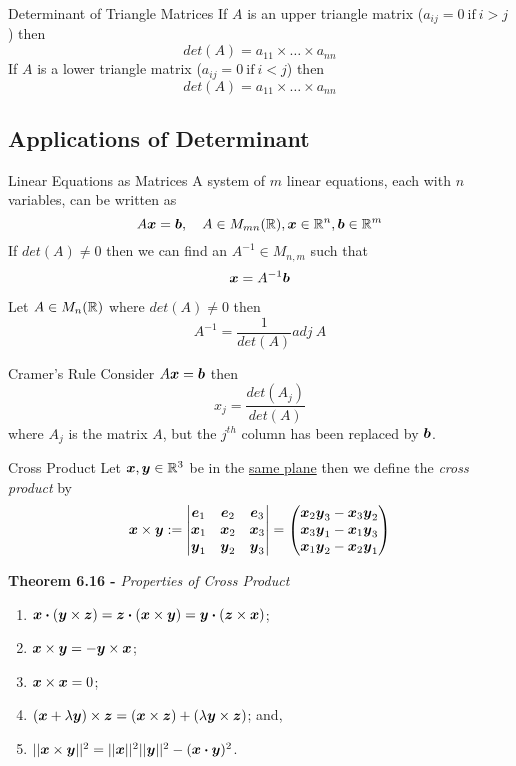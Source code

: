 \documentclass[11pt,a4paper]{article}
\begin{document}
\subtitle{Remark 6.11 - }{Determinant of Triangle Matrices}
If $A$ is an upper triangle matrix ($a_{ij} = 0 \mathrm{\ if\ } i > j$) then $$det(A) = a_{11} \times \dots \times a_{nn}$$
If $A$ is a lower triangle matrix ($a_{ij} = 0 \mathrm{\ if\ } i < j$) then $$det(A) = a_{11} \times \dots \times a_{nn}$$

\subsection{Applications of Determinant}

\subtitle{Theorem 6.12 - }{Linear Equations as Matrices}
A system of $m$ linear equations, each with $n$ variables, can be written as $$A\boldsymbol{x} = \boldsymbol{b},\quad A \in M_{mn}(\mathbb{R}), \boldsymbol{x} \in \mathbb{R}^n, \boldsymbol{b} \in \mathbb{R}^m$$
If $det(A) \not = 0$ then we can find an $A^{-1} \in M_{n,m}$ such that $$\boldsymbol{x} = A^{-1}\boldsymbol{b}$$

\subtitle{Theorem 6.13}{}
Let $A \in M_n(\mathbb{R})$ where $det(A) \not = 0$ then $$A^{-1} = \frac{1}{det(A)}adj\ A$$

\subtitle{Theorem 6.14 - }{Cramer's Rule}
Consider $A\boldsymbol{x} = \boldsymbol{b}$ then $$x_j = \frac{det(A_j)}{det(A)}$$ where $A_j$ is the matrix $A$, but the $j^{th}$ column has been replaced by $\boldsymbol{b}$. \\

\subtitle{Definition 6.15 - }{Cross Product}
Let $\boldsymbol{x}, \boldsymbol{y} \in \mathbb{R}^3$ be in the \underline{same plane} then we define the \textit{cross product} by
$$\boldsymbol{x} \times \boldsymbol{y} := \begin{vmatrix}
  \boldsymbol{e}_1 & \boldsymbol{e}_2 & \boldsymbol{e}_3 \\
  \boldsymbol{x}_1 & \boldsymbol{x}_2 & \boldsymbol{x}_3 \\
  \boldsymbol{y}_1 & \boldsymbol{y}_2 & \boldsymbol{y}_3
\end{vmatrix} = \begin{pmatrix}
  \boldsymbol{x}_2\boldsymbol{y}_3 - \boldsymbol{x}_3\boldsymbol{y}_2 \\
  \boldsymbol{x}_3\boldsymbol{y}_1 - \boldsymbol{x}_1\boldsymbol{y}_3 \\
  \boldsymbol{x}_1\boldsymbol{y}_2 - \boldsymbol{x}_2\boldsymbol{y}_1
\end{pmatrix}$$

\textbf{Theorem 6.16 - }\textit{Properties of Cross Product}
\begin{enumerate}[label=\roman*)]
  \item $ \boldsymbol{x} \boldsymbol{\cdot} (\boldsymbol{y} \times \boldsymbol{z}) = \boldsymbol{z} \boldsymbol{\cdot} (\boldsymbol{x} \times \boldsymbol{y}) = \boldsymbol{y} \boldsymbol{\cdot} (\boldsymbol{z} \times \boldsymbol{x}) $;
  \item $ \boldsymbol{x} \times \boldsymbol{y} = - \boldsymbol{y} \times \boldsymbol{x} $;
  \item $ \boldsymbol{x} \times \boldsymbol{x} = 0 $;
  \item $ (\boldsymbol{x} + \lambda\boldsymbol{y}) \times \boldsymbol{z} = (\boldsymbol{x} \times \boldsymbol{z}) + (\lambda\boldsymbol{y} \times \boldsymbol{z}) $; and,
  \item $ ||\boldsymbol{x} \times \boldsymbol{y}||^2 = ||\boldsymbol{x}||^2||\boldsymbol{y}||^2 - (\boldsymbol{x} \boldsymbol{\cdot} \boldsymbol{y})^2$.
\end{enumerate}
\end{document}
